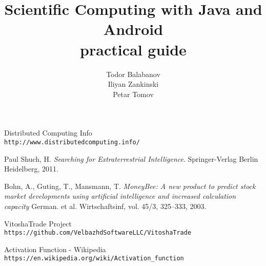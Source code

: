 \documentclass[book,14pt,oneside,openany]{memoir}
\title{Scientific Computing with Java and Android \\ practical guide}
\author{Todor Balabanov \\ Iliyan Zankinski \\ Petar Tomov}
\begin{document}
\maketitle

\thispagestyle{empty}

\newpage
{}

\newpage
\tableofcontents

\renewcommand\thesection{\thechapter.\arabic{section}}
\renewcommand\thesubsection{\thesection.\arabic{subsection}}











\newpage
\begin{thebibliography}{99}

 Distributed Computing Info \\\texttt{http://www.distributedcomputing.info/}

 Paul Shuch, H. \textit{Searching for Extraterrestrial Intelligence}. Springer-Verlag Berlin Heidelberg, 2011.

 Bohn, A., Guting, T., Mansmann, T. \textit{MoneyBee: A new product to predict stock market developments using artificial intelligence and increased calculation capacity} German. et al. Wirtschaftsinf, vol. 45/3, 325--333, 2003.

 VitoshaTrade Project \\\texttt{https://github.com/VelbazhdSoftwareLLC/VitoshaTrade}

 Activation Function - Wikipedia \\\texttt{https://en.wikipedia.org/wiki/Activation\_function}
\end{thebibliography}

\newpage
\listoffigures


\newpage
\printindex
\end{document}
